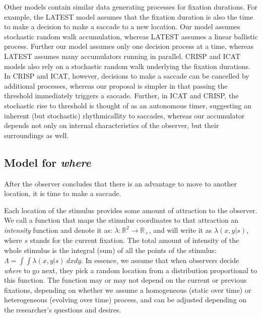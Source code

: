 \documentclass{article}
\begin{document}
Other models contain similar data generating processes for fixation durations. For example, the LATEST model \citep{tatler2017latest} assumes that the fixation duration is also the time to make a decision to make a saccade to a new location. Our model assumes stochastic random walk accumulation, whereas LATEST assumes a linear ballistic process. Further our model assumes only one decision process at a time, whereas LATEST assumes many accumulators running in parallel. CRISP \citep{nuthmann2010crisp} and ICAT \citep{trukenbrod2014icat} models also rely on a stochastic random walk underlying the fixation durations. In CRISP and ICAT, however, decisions to make a saccade can be cancelled by additional processes, whereas our proposal is simpler in that passing the threshold immediately triggers a saccade. Further, in ICAT and CRISP, the stochastic rise to threshold is thought of as an autonomous timer, suggesting an inherent (but stochastic) rhythmicallity to saccades, whereas our accumulator depends not only on internal characteristics of the observer, but their surroundings as well.

\subsection{Model for \textit{where}}

After the observer concludes that there is an advantage to move to another location, it is time to make a saccade.

Each location of the stimulus provides some amount of attraction to the observer. We call a function that maps the stimulus coordinates to that attraction an \textit{intensity} function and denote it as: $\lambda: \mathbb{R}^2 \rightarrow \mathbb{R}_+$, and will write it as $\lambda(x, y | s)$, where $s$ stands for the current fixation. The total amount of intensity of the whole stimulus is the integral (sum) of all the points of the stimulus: $\Lambda = \int\int \lambda(x, y | s)~dx dy$. In essence, we assume that when observers decide \textit{where} to go next, they pick a random location from a distribution proportional to this function. The function may or may not depend on the current or previous fixations, depending on whether we assume a homogeneous (static over time) or heterogeneous (evolving over time) process, and can be adjusted depending on the researcher's questions and desires.
\end{document}
